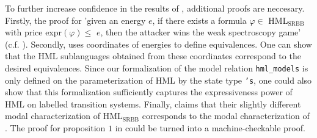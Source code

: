 To further increase confidence in the results of \cite{bisping2023lineartimebranchingtime}, additional proofs are neccesary. Firstly, the proof for 'given an energy $e$, if there exists a formula $\varphi \in$ HML$_\text{SRBB}$ with price expr$(\varphi) \leq$ $e$, then the attacker wins the weak spectroscopy game' (c.f. \cite[lemma $1$]{bisping2023lineartimebranchingtime}).
Secondly, \cite{bisping2023lineartimebranchingtime} uses coordinates of energies to define equivalences. One can show that the HML sublanguages obtained from these coordinates correspond to the desired equivalences.
Since our formalization of the model relation \texttt{hml\_models} is only defined on the parameterization of HML by the state type \texttt{'s}, one could also show that this formalization sufficiently captures the expressiveness power of HML on labelled transition systems.
Finally, \cite[proposition 1]{bisping2023lineartimebranchingtime} claims that their slightly different modal characterization of HML$_\text{SRBB}$ corresponds to the modal characterization of \cite{FOKKINK2019104435}. 
The proof for proposition $1$ in \cite{bisping2023lineartimebranchingtime} could be turned into a machine-checkable proof. 